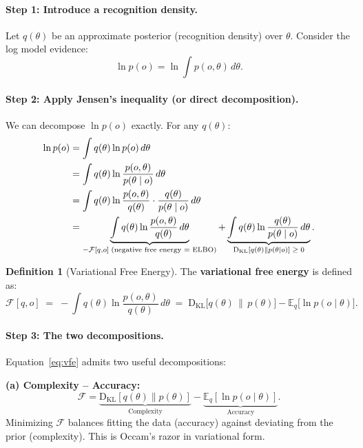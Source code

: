 \documentclass[11pt,a4paper]{article}
\theoremstyle{definition}
\newtheorem{definition}[theorem]{Definition}
\newcommand{\KL}{\mathrm{D}_{\mathrm{KL}}}
\newcommand{\E}{\mathbb{E}}
\newcommand{\cF}{\mathcal{F}}
\begin{document}
\paragraph{Step 1: Introduce a recognition density.}
Let $q(\theta)$ be an approximate posterior (recognition density) over $\theta$.
Consider the log model evidence:
\begin{equation}
  \ln p(o) = \ln \int p(o, \theta)\, d\theta.
  \label{eq:logev}
\end{equation}

\paragraph{Step 2: Apply Jensen's inequality (or direct decomposition).}
We can decompose $\ln p(o)$ exactly.  For any $q(\theta)$:
\begin{align}
  \ln p(o)
  &= \int q(\theta) \ln p(o)\, d\theta
  \notag \\
  &= \int q(\theta) \ln \frac{p(o, \theta)}{p(\theta \mid o)}\, d\theta
  \notag \\
  &= \int q(\theta) \ln \frac{p(o, \theta)}{q(\theta)}
     \cdot \frac{q(\theta)}{p(\theta \mid o)}\, d\theta
  \notag \\
  &= \underbrace{\int q(\theta) \ln \frac{p(o, \theta)}{q(\theta)}\, d\theta}_{
       -\cF[q, o] \;\text{(negative free energy = ELBO)}}
   + \underbrace{\int q(\theta) \ln \frac{q(\theta)}{p(\theta \mid o)}\, d\theta}_{
       \KL[q(\theta) \| p(\theta \mid o)] \;\geq\; 0}.
  \label{eq:decomp}
\end{align}

\begin{definition}[Variational Free Energy]
The \textbf{variational free energy} is defined as:
\begin{equation}
  \boxed{
  \cF[q, o] \;=\; -\int q(\theta) \ln \frac{p(o, \theta)}{q(\theta)}\, d\theta
  \;=\; \KL\bigl[q(\theta) \,\|\, p(\theta)\bigr]
       - \E_{q}\bigl[\ln p(o \mid \theta)\bigr].
  }
  \label{eq:vfe}
\end{equation}
\end{definition}

\paragraph{Step 3: The two decompositions.}
Equation~\eqref{eq:vfe} admits two useful decompositions:

\medskip
\noindent
\textbf{(a) Complexity -- Accuracy:}
\begin{equation}
  \cF = \underbrace{\KL[q(\theta) \| p(\theta)]}_{\text{Complexity}}
      - \underbrace{\E_q[\ln p(o \mid \theta)]}_{\text{Accuracy}}.
  \label{eq:ca}
\end{equation}
Minimizing $\cF$ balances fitting the data (accuracy) against deviating from
the prior (complexity).  This is Occam's razor in variational form.
\end{document}
